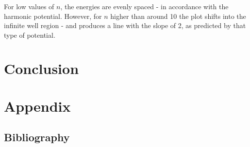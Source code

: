 \documentclass[11pt]{article}
\begin{document}
For low values of $n$, the energies are evenly spaced - in accordance with the 
harmonic potential. However, for $n$ higher than around 10 the plot shifts into the
infinite well region - and produces a line with the slope of 2, as predicted by
that type of potential.

\section{Conclusion}

\section{Appendix}

\listoffigures

\subsection*{Bibliography}



\end{document}
